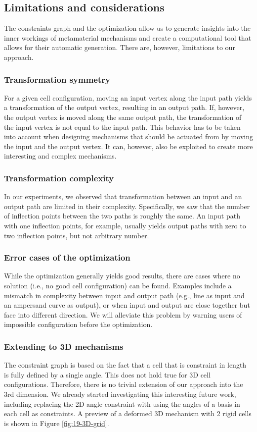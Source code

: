\subsection{Limitations and considerations}

The constraints graph and the optimization allow us to generate insights into the inner workings of metamaterial mechanisms and create a computational tool that allows for their automatic generation. There are, however, limitations to our approach.

\subsubsection{Transformation symmetry}
For a given cell configuration, moving an input vertex along the input path yields a transformation of the output vertex, resulting in an output path. If, however, the output vertex is moved along the same output path, the transformation of the input vertex is not equal to the input path. This behavior has to be taken into account when designing mechanisms that should be actuated from by moving the input and the output vertex. It can, however, also be exploited to create more interesting and complex mechanisms.

\subsubsection{Transformation complexity}
In our experiments, we observed that transformation between an input and an output path are limited in their complexity. Specifically, we saw that the number of inflection points between the two paths is roughly the same. An input path with one inflection points, for example, usually yields output paths with zero to two inflection points, but not arbitrary number. 

\subsubsection{Error cases of the optimization}
While the optimization generally yields good results, there are cases where no solution (i.e., no good cell configuration) can be found. Examples include a mismatch in complexity between input and output path (e.g., line as input and an ampersand curve as output), or when input and output are close together but face into different direction. We will alleviate this problem by warning users of impossible configuration before the optimization. 

\subsubsection{Extending to 3D mechanisms}
The constraint graph is based on the fact that a cell that is constraint in length is fully defined by a single angle. This does not hold true for 3D cell configurations. Therefore, there is no trivial extension of our approach into the 3rd dimension. We already started investigating this interesting future work, including replacing the 2D angle constraint with using the angles of a basis in each cell as constraints. A preview of a deformed 3D mechanism with 2 rigid cells is shown in Figure \ref{fig:19-3D-grid}.

